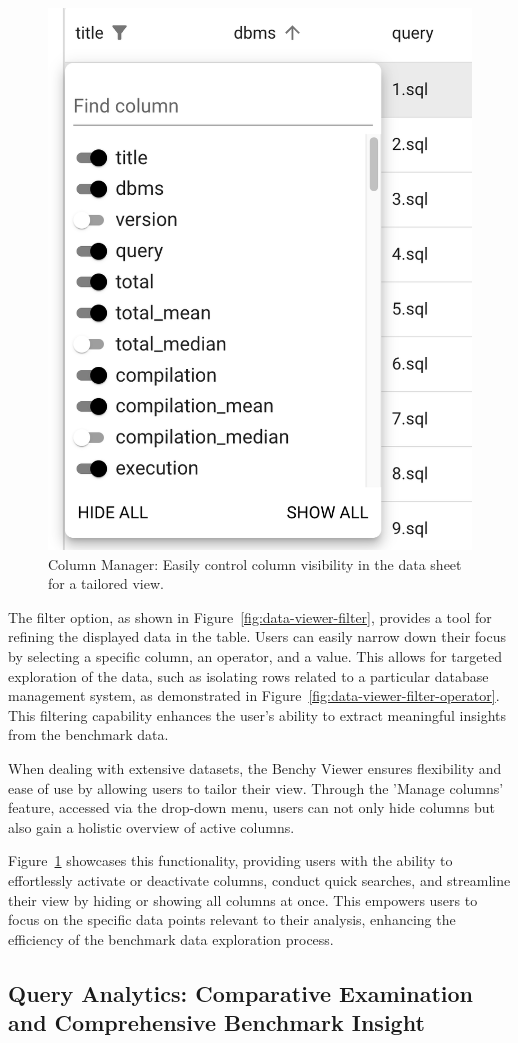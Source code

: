 \begin{figure}[h]
  \vspace{1cm}
  \centering
  \includegraphics[width=0.3\linewidth]{figures/data-viewer-manage-columns.png}
  \caption{Column Manager: Easily control column visibility in the data sheet for a tailored view.}
  \label{fig:data-viewer-manage-columns}
\end{figure}

The filter option, as shown in Figure~\ref{fig:data-viewer-filter}, provides a tool for refining the displayed data in the table. Users can easily narrow down their focus by selecting a specific column, an operator, and a value. This allows for targeted exploration of the data, such as isolating rows related to a particular database management system, as demonstrated in Figure~\ref{fig:data-viewer-filter-operator}. This filtering capability enhances the user's ability to extract meaningful insights from the benchmark data.

When dealing with extensive datasets, the Benchy Viewer ensures flexibility and ease of use by allowing users to tailor their view. Through the 'Manage columns' feature, accessed via the drop-down menu, users can not only hide columns but also gain a holistic overview of active columns. 

Figure~\ref{fig:data-viewer-manage-columns} showcases this functionality, providing users with the ability to effortlessly activate or deactivate columns, conduct quick searches, and streamline their view by hiding or showing all columns at once. This empowers users to focus on the specific data points relevant to their analysis, enhancing the efficiency of the benchmark data exploration process.




\subsection{Query Analytics: Comparative Examination and Comprehensive Benchmark Insight }\label{sec:query-analytics}

